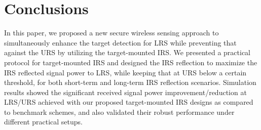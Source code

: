 \documentclass[10pt,final,doublecolumn]{IEEEtran}
\begin{document}
\section{Conclusions}
In this paper, we proposed a new secure wireless sensing approach to simultaneously enhance the target detection for LRS while preventing that against the URS by utilizing the target-mounted IRS.
We presented a practical protocol for target-mounted IRS and designed the IRS reflection to maximize the IRS reflected
signal power to LRS, while keeping that at URS
below a certain threshold, for both short-term and long-term IRS reflection scenarios. Simulation results showed the significant received signal power improvement/reduction at LRS/URS achieved with our proposed
target-mounted IRS designs as compared to
benchmark schemes, and also validated their robust performance
under different practical setups.
\end{document}
